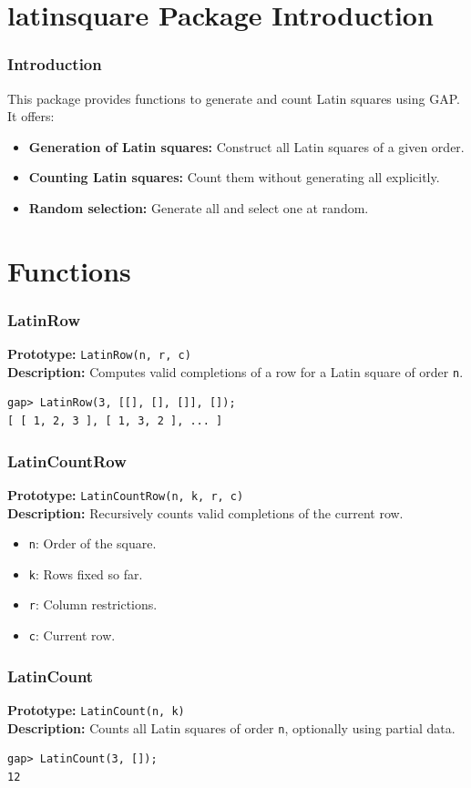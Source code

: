 \documentclass{beamer}
\begin{document}
\begin{frame}
\section{latinsquare Package Introduction}
\begin{frame}
\frametitle{Introduction}
This package provides functions to generate and count Latin squares using GAP. It offers:
\begin{itemize}
  \item \textbf{Generation of Latin squares:} Construct all Latin squares of a given order.
  \item \textbf{Counting Latin squares:} Count them without generating all explicitly.
  \item \textbf{Random selection:} Generate all and select one at random.
\end{itemize}
\end{frame}

\section{Functions}
\begin{frame}[fragile]
\frametitle{LatinRow}
\textbf{Prototype:} \texttt{LatinRow(n, r, c)}\\
\textbf{Description:} Computes valid completions of a row for a Latin square of order \texttt{n}.
\begin{lstlisting}
gap> LatinRow(3, [[], [], []], []);
[ [ 1, 2, 3 ], [ 1, 3, 2 ], ... ]
\end{lstlisting}
\end{frame}

\begin{frame}[fragile]
\frametitle{LatinCountRow}
\textbf{Prototype:} \texttt{LatinCountRow(n, k, r, c)}\\
\textbf{Description:} Recursively counts valid completions of the current row.
\begin{itemize}
  \item \texttt{n}: Order of the square.
  \item \texttt{k}: Rows fixed so far.
  \item \texttt{r}: Column restrictions.
  \item \texttt{c}: Current row.
\end{itemize}
\end{frame}

\begin{frame}[fragile]
\frametitle{LatinCount}
\textbf{Prototype:} \texttt{LatinCount(n, k)}\\
\textbf{Description:} Counts all Latin squares of order \texttt{n}, optionally using partial data.
\begin{lstlisting}
gap> LatinCount(3, []);
12
\end{lstlisting}
\end{frame}


\end{frame}
\end{document}
